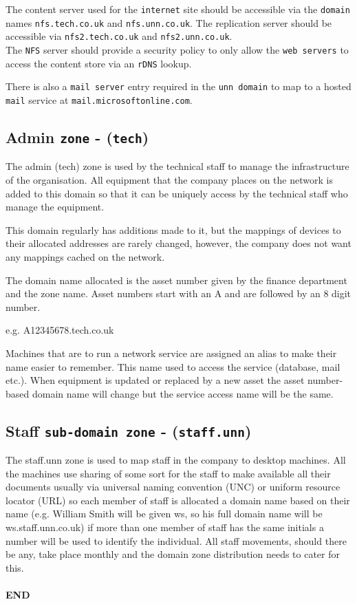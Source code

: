 \documentclass[11pt]{article}
\begin{document}
\noindent The content server used for the \texttt{internet} site should be accessible via the \texttt{domain} names \texttt{nfs.tech.co.uk} and 
\texttt{nfs.unn.co.uk}. The replication server should be accessible via \texttt{nfs2.tech.co.uk} and \texttt{nfs2.unn.co.uk}.\\

\noindent The \texttt{NFS} server should provide a security policy to only allow the \texttt{web servers} to access the content store via an \texttt{rDNS} lookup.

\noindent There is also a \texttt{mail server} entry required in the \texttt{unn domain} to map to a hosted \texttt{mail} service at \texttt{mail.microsoftonline.com}. 

\subsection{Admin \texttt{zone} - (\texttt{tech})}

The admin (tech) zone is used by the technical staff to manage the infrastructure of the organisation. All equipment that the company places on the network is added to this domain so that it can be uniquely access by the technical staff who manage the equipment.

This domain regularly has additions made to it, but the mappings of devices to their allocated addresses are rarely changed, however, the company does not want any mappings cached on the network.

The domain name allocated is the asset number given by the finance department and the zone name. Asset numbers start with an A and are followed by an 8 digit number.

e.g. A12345678.tech.co.uk

Machines that are to run a network service are assigned an alias to make their name easier to remember. This name used to access the service (database, mail etc.). When equipment is updated or replaced by a new asset the asset number-based domain name will change but the service access name will be the same.

\subsection{Staff \texttt{sub-domain zone} - (\texttt{staff.unn})}

The staff.unn zone is used to map staff in the company to desktop machines. All the machines use sharing of some sort for the staff to make available all their documents usually via universal naming convention (UNC) or uniform resource locator (URL) so each member of staff is allocated a domain name based on their name (e.g. William Smith will be given ws, so his full domain name will be ws.staff.unn.co.uk) if more than one member of staff has the same initials a number will be used to identify the individual. All staff movements, should there be any, take place monthly and the domain zone distribution needs to cater for this.\\

\\\noindent \textbf{END}
\end{document}
